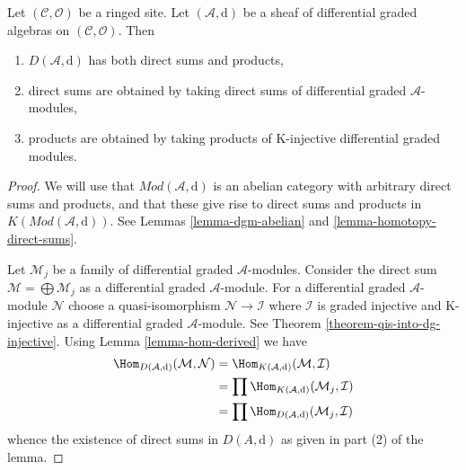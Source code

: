 \begin{lemma}
\label{lemma-derived-products}
Let $(\mathcal{C}, \mathcal{O})$ be a ringed site. Let
$(\mathcal{A}, \text{d})$ be a sheaf of differential graded algebras
on $(\mathcal{C}, \mathcal{O})$. Then
\begin{enumerate}
\item $D(\mathcal{A}, \text{d})$ has both direct sums and products,
\item direct sums are obtained by taking direct sums of differential graded
$\mathcal{A}$-modules,
\item products are obtained by taking products of
K-injective differential graded modules.
\end{enumerate}
\end{lemma}

\begin{proof}
We will use that $\textit{Mod}(\mathcal{A}, \text{d})$ is an abelian category
with arbitrary direct sums and products, and that these give rise
to direct sums and products in $K(\textit{Mod}(\mathcal{A}, \text{d}))$.
See Lemmas \ref{lemma-dgm-abelian} and \ref{lemma-homotopy-direct-sums}.

\medskip\noindent
Let $\mathcal{M}_j$ be a family of differential graded $\mathcal{A}$-modules.
Consider the direct sum $\mathcal{M} = \bigoplus \mathcal{M}_j$
as a differential graded $\mathcal{A}$-module.
For a differential graded $\mathcal{A}$-module
$\mathcal{N}$ choose a quasi-isomorphism
$\mathcal{N} \to \mathcal{I}$ where
$\mathcal{I}$ is graded injective and K-injective as a
differential graded $\mathcal{A}$-module. See
Theorem \ref{theorem-qis-into-dg-injective}.
Using Lemma \ref{lemma-hom-derived} we have
\begin{align*}
\Hom_{D(\mathcal{A}, \text{d})}(\mathcal{M}, \mathcal{N})
& =
\Hom_{K(\mathcal{A}, \text{d})}(\mathcal{M}, \mathcal{I}) \\
& =
\prod \Hom_{K(\mathcal{A}, \text{d})}(\mathcal{M}_j, \mathcal{I}) \\
& =
\prod \Hom_{D(\mathcal{A}, \text{d})}(\mathcal{M}_j, \mathcal{I})
\end{align*}
whence the existence of direct sums in $D(A, \text{d})$ as given in
part (2) of the lemma.


\end{proof}
